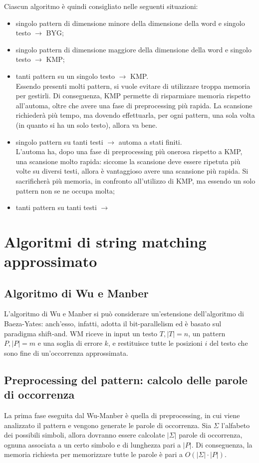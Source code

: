 Ciascun algoritmo è quindi consigliato nelle seguenti situazioni:
\begin{itemize}
    \item singolo pattern di dimensione minore della dimensione della word e singolo testo $\longrightarrow$ BYG;
    \item singolo pattern di dimensione maggiore della dimensione della word e singolo testo $\longrightarrow$ KMP;
    \item tanti pattern su un singolo testo $\longrightarrow$ KMP.\\
    Essendo presenti molti pattern, si vuole evitare di utilizzare troppa memoria per gestirli. Di conseguenza, KMP permette di risparmiare memoria rispetto all'automa, oltre che avere una fase di preprocessing più rapida. La scansione richiederà più tempo, ma dovendo effettuarla, per ogni pattern, una sola volta (in quanto si ha un solo testo), allora va bene.
    \item singolo pattern su tanti testi $\longrightarrow$ automa a stati finiti.\\
    L'automa ha, dopo una fase di preprocessing più onerosa rispetto a KMP, una scansione molto rapida: siccome la scansione deve essere ripetuta più volte su diversi testi, allora è vantaggioso avere una scansione più rapida. Si sacrificherà più memoria, in confronto all'utilizzo di KMP, ma essendo un solo pattern non se ne occupa molta;
    \item tanti pattern su tanti testi $\longrightarrow$
\end{itemize}

\section{Algoritmi di string matching approssimato}
\subsection{Algoritmo di Wu e Manber}
L'algoritmo di Wu e Manber si può considerare un'estensione dell'algoritmo di Baeza-Yates: anch'esso, infatti, adotta il bit-parallelism ed è basato sul paradigma shift-and.
WM riceve in input un testo $T, |T| = n$, un pattern $P, |P|=m$ e una soglia di errore $k$, e restituisce tutte le posizioni $i$ del testo che sono fine di un'occorrenza approssimata.

\subsection*{Preprocessing del pattern: calcolo delle parole di occorrenza}
La prima fase eseguita dal Wu-Manber è quella di preprocessing, in cui viene analizzato il pattern e vengono generate le parole di occorrenza. Sia $\Sigma$ l'alfabeto dei possibili simboli, allora dovranno essere calcolate $|\Sigma|$ parole di occorrenza, ognuna associata a un certo simbolo e di lunghezza pari a $|P|$.
Di conseguenza, la memoria richiesta per memorizzare tutte le parole è pari a $O(|\Sigma| \cdot |P|)$.

